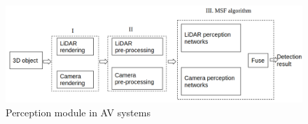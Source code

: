 %
%
%
%
%
\begin{figure}
	\centering
	\includegraphics[width=0.8\linewidth]{figure/structure.png}
	\caption{Perception module in AV systems}
	\label{fig:module}
\end{figure}

